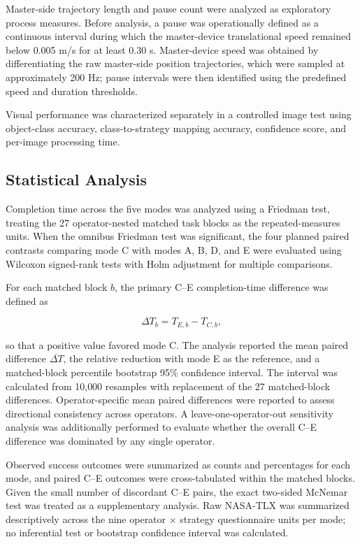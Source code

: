 Master-side trajectory length and pause count were analyzed as exploratory process measures. Before analysis, a pause was operationally defined as a continuous interval during which the master-device translational speed remained below 0.005 m/s for at least 0.30 s. Master-device speed was obtained by differentiating the raw master-side position trajectories, which were sampled at approximately 200 Hz; pause intervals were then identified using the predefined speed and duration thresholds.

Visual performance was characterized separately in a controlled image test using object-class accuracy, class-to-strategy mapping accuracy, confidence score, and per-image processing time.

\subsection{Statistical Analysis}
Completion time across the five modes was analyzed using a Friedman test, treating the 27 operator-nested matched task blocks as the repeated-measures units. When the omnibus Friedman test was significant, the four planned paired contrasts comparing mode C with modes A, B, D, and E were evaluated using Wilcoxon signed-rank tests with Holm adjustment for multiple comparisons.

For each matched block $b$, the primary C--E completion-time difference was defined as

\begin{equation}
\label{eq:ce-completion-difference}
\Delta T_b=T_{E,b}-T_{C,b},
\end{equation}

so that a positive value favored mode C. The analysis reported the mean paired difference $\overline{\Delta T}$, the relative reduction with mode E as the reference, and a matched-block percentile bootstrap 95\% confidence interval. The interval was calculated from 10{,}000 resamples with replacement of the 27 matched-block differences. Operator-specific mean paired differences were reported to assess directional consistency across operators. A leave-one-operator-out sensitivity analysis was additionally performed to evaluate whether the overall C--E difference was dominated by any single operator.

Observed success outcomes were summarized as counts and percentages for each mode, and paired C--E outcomes were cross-tabulated within the matched blocks. Given the small number of discordant C--E pairs, the exact two-sided McNemar test was treated as a supplementary analysis. Raw NASA-TLX was summarized descriptively across the nine operator $\times$ strategy questionnaire units per mode; no inferential test or bootstrap confidence interval was calculated.

